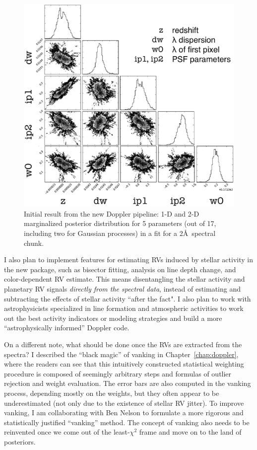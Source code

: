 \begin{figure}
\centering
\includegraphics[scale=0.25]{conclusion/mcmcplot-labeled.eps}
\caption{Initial result from the new Doppler pipeline: 1-D and 2-D
  marginalized posterior distribution for 5 parameters (out of 17,
  including two for Gaussian processes) in a fit for a 2\AA\ spectral
  chunk.\label{conclusion:fig:mcmc}}
\end{figure}


I also plan to implement features for estimating RVs induced by
stellar activity in the new package, such as bisector fitting,
analysis on line depth change, and color-dependent RV estimate. This
means disentangling the stellar activity and planetary RV signals
{\em directly from the spectral data}, instead of
estimating and subtracting the effects of stellar activity ``after the
fact". I also plan to work with astrophysicists specialized in line
formation and atmospheric activities to work out the best activity
indicators or modeling strategies and build a more ``astrophysically
informed'' Doppler code.

On a different note, what should be done once the RVs are extracted
from the spectra? I described the ``black magic'' of vanking in
Chapter~\ref{chap:doppler}, where the readers can see that this
intuitively constructed statistical weighting procedure is composed of
seemingly arbitrary steps and formulas of outlier rejection and weight
evaluation. The error bars are also computed in the vanking process,
depending mostly on the weights, but they often appear to be
underestimated (not only due to the existence of stellar RV
jitter). To improve vanking, I am collaborating with Ben Nelson to
formulate a more rigorous and statistically justified ``vanking''
method. The concept of vanking also needs to be reinvented once we
come out of the least-$\chi^2$ frame and move on to the land of
posteriors.

